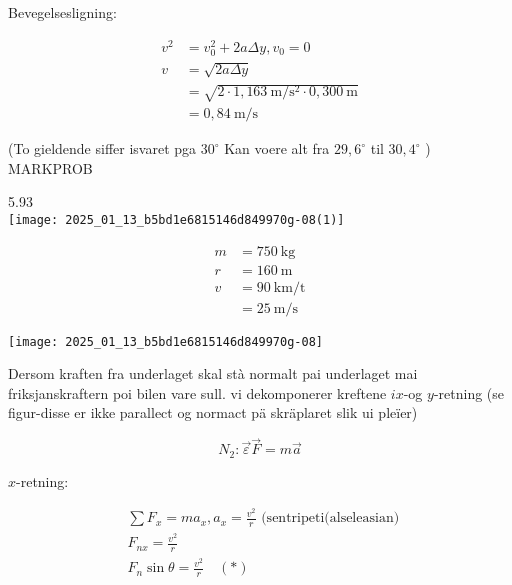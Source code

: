 \documentclass[10pt]{article}
\begin{document}
Bevegelsesligning:

$$
\begin{aligned}
v^{2} & =v_{0}^{2}+2 a \Delta y, v_{0}=0 \\
v & =\sqrt{2 a \Delta y} \\
& =\sqrt{2 \cdot 1,163 \mathrm{~m} / \mathrm{s}^{2} \cdot 0,300 \mathrm{~m}} \\
& =0,84 \mathrm{~m} / \mathrm{s}
\end{aligned}
$$

(To gieldende siffer isvaret pga $30^{\circ}$ Kan voere alt fra $29,6^{\circ}$ til $30,4^{\circ}$ )\\

MARKPROB

5.93\\
\texttt{[image: 2025\_01\_13\_b5bd1e6815146d849970g-08(1)]}

$$
\begin{aligned}
m & =750 \mathrm{~kg} \\
r & =160 \mathrm{~m} \\
v & =90 \mathrm{~km} / \mathrm{t} \\
& =25 \mathrm{~m} / \mathrm{s}
\end{aligned}
$$

\begin{center}
\texttt{[image: 2025\_01\_13\_b5bd1e6815146d849970g-08]}
\end{center}

Dersom kraften fra underlaget skal stà normalt pai underlaget mai friksjanskraftern poi bilen vare sull. vi dekomponerer kreftene $i x$-og $y$-retning (se figur-disse er ikke parallect og normact pä skräplaret slik ui pleïer)

$$
N_{2}: \vec{\varepsilon} \vec{F}=m \vec{a}
$$

$x$-retning:

$$
\begin{aligned}
& \sum F_{x}=m a_{x}, a_{x}=\frac{v^{2}}{r} \text { (sentripeti(alseleasian) } \\
& F_{n x}=\frac{v^{2}}{r} \\
& F_{n} \sin \theta=\frac{v^{2}}{r} \quad(*)
\end{aligned}
$$
\end{document}
